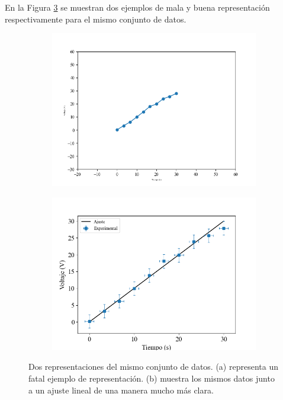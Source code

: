 \documentclass{book}
\begin{document}
En la Figura \ref{fig:dosgrafs} se muestran dos ejemplos de mala y buena representación 
respectivamente para el mismo conjunto de datos.

\begin{figure}[h]
  
  \begin{adjustwidth}{-3cm}{-4.5cm}
  \centering
  \begin{subfigure}{0.45\pdfpagewidth}
      \centering
      \includegraphics[width=\linewidth]{assets/fig/malagrafica.png}
      \caption{}
      \label{fig:malagraf}
  \end{subfigure}
  \hfill
  \begin{subfigure}{0.45\pdfpagewidth}
      \centering
      \includegraphics[width=\linewidth]{assets/fig/buenagrafica.png}
      \caption{}
      \label{fig:buenagraf}
  \end{subfigure}
  \end{adjustwidth}
  \caption{Dos representaciones del mismo conjunto de datos. (a) representa un fatal
  ejemplo de representación. (b) muestra los mismos datos junto a un ajuste lineal
  de una manera mucho más clara.}
  \label{fig:dosgrafs}
  
\end{figure}
\end{document}

